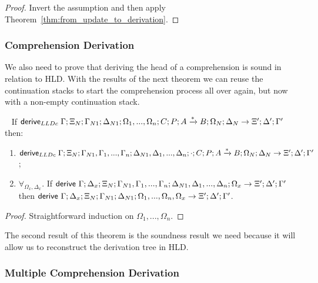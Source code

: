 \begin{proof}
Invert the assumption and then apply Theorem~\ref{thm:from_update_to_derivation}.
\end{proof}

\subsubsection{Comprehension Derivation}

We also need to prove that deriving the head of a comprehension is sound in relation to HLD.
With the results of the next theorem we can reuse the continuation stacks to start the comprehension
process all over again, but now with a non-empty continuation stack.

\begin{theorem}\label{thm:comprehension_derivation}
~\newline
If $\mathsf{derive}_{LLDc} \; \Gamma; \Xi_N; \Gamma_{N1}; \Delta_{N1}; \Omega_1, ..., \Omega_n; C; P; A \xrightarrow{*} B; \Omega_N; \Delta_N \rightarrow \Xi'; \Delta'; \Gamma'$ then:

\begin{enumerate}
   \item $\mathsf{derive}_{LLDc} \; \Gamma; \Xi_N; \Gamma_{N1}, \Gamma_1, ..., \Gamma_n; \Delta_{N1}, \Delta_1, ..., \Delta_n; \cdot; C; P; A \xrightarrow{*} B; \Omega_N; \Delta_N \rightarrow \Xi'; \Delta'; \Gamma'$;
   \item $\forall_{\Omega_x, \Delta_x}.$ If $\mathsf{derive}~ \Gamma; \Delta_x; \Xi_N; \Gamma_{N1}, \Gamma_1, ..., \Gamma_n; \Delta_{N1}, \Delta_1, ..., \Delta_n; \Omega_x \rightarrow \Xi'; \Delta'; \Gamma'$ then \linebreak $\mathsf{derive}~ \Gamma; \Delta_x; \Xi_N; \Gamma_{N1}; \Delta_{N1}; \Omega_1, ..., \Omega_n, \Omega_x \rightarrow \Xi'; \Delta'; \Gamma'$.
\end{enumerate}
\end{theorem}

\begin{proof}
Straightforward induction on $\Omega_1, ..., \Omega_n$.
\end{proof}

The second result of this theorem is the soundness result we need because it will allow us to reconstruct the derivation tree in HLD.

\subsubsection{Multiple Comprehension Derivation}


